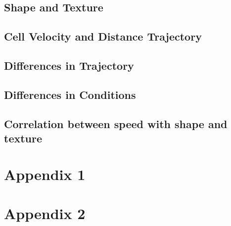\documentclass{article}
\begin{document}
\subsection*{Shape and Texture}
\subsection*{Cell Velocity and Distance Trajectory}
\subsection*{Differences in Trajectory}
\subsection*{Differences in Conditions}
\subsection*{Correlation between speed with shape and texture}
\section*{Appendix 1}



\section*{Appendix 2}




\end{document}
